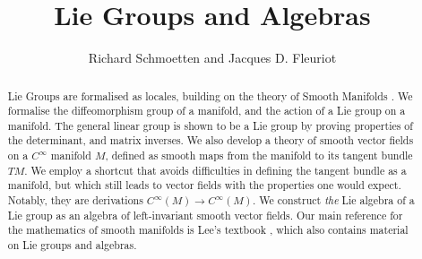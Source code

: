 \documentclass[11pt,a4paper]{article}
\begin{document}
\title{Lie Groups and Algebras}
\author{Richard Schmoetten and Jacques D. Fleuriot}
\maketitle

\begin{abstract}
	Lie Groups are formalised as locales, building on the theory of Smooth Manifolds \cite{Smooth_Manifolds-AFP}. We formalise the diffeomorphism group of a manifold, and the action of a Lie group on a manifold. The general linear group is shown to be a Lie group by proving properties of the determinant, and matrix inverses.
	We also develop a theory of smooth vector fields on a $C^\infty$ manifold $M$, defined as smooth maps from the manifold to its tangent bundle $TM$. We employ a shortcut that avoids difficulties in defining the tangent bundle as a manifold, but which still leads to vector fields with the properties one would expect. Notably, they are derivations $C^\infty(M) \to C^\infty(M)$.
	We construct \emph{the} Lie algebra of a Lie group as an algebra of left-invariant smooth vector fields. Our main reference for the mathematics of smooth manifolds is Lee's textbook \cite{lee2012}, which also contains material on Lie groups and algebras.
\end{abstract}

\tableofcontents





\end{document}
